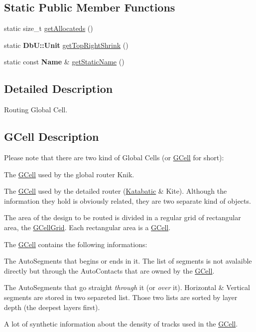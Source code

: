 \subsection*{Static Public Member Functions}
\begin{DoxyCompactItemize}
\item 
static size\+\_\+t \hyperlink{classKatabatic_1_1GCell_a91c8bc1a6bdb1b15c3c084ebfd38af47}{get\+Allocateds} ()
\item 
static \textbf{ Db\+U\+::\+Unit} \hyperlink{classKatabatic_1_1GCell_ac594cb2832ee7ef410c89499258d38fd}{get\+Top\+Right\+Shrink} ()
\item 
static const \textbf{ Name} \& \hyperlink{classKatabatic_1_1GCell_a00e56270cfb31f56e52e31afbc33ba71}{get\+Static\+Name} ()
\end{DoxyCompactItemize}


\subsection{Detailed Description}
Routing Global Cell. 

\hypertarget{classKatabatic_1_1GCell_secGCellDescription}{}\subsection{G\+Cell Description}\label{classKatabatic_1_1GCell_secGCellDescription}
Please note that there are two kind of Global Cells (or \hyperlink{classKatabatic_1_1GCell}{G\+Cell} for short)\+:
\begin{DoxyItemize}
\item The \hyperlink{classKatabatic_1_1GCell}{G\+Cell} used by the global router Knik.
\item The \hyperlink{classKatabatic_1_1GCell}{G\+Cell} used by the detailed router (\hyperlink{namespaceKatabatic}{Katabatic} \& Kite). Although the information they hold is obviously related, they are two separate kind of objects.
\end{DoxyItemize}

The area of the design to be routed is divided in a regular grid of rectangular area, the \hyperlink{classKatabatic_1_1GCellGrid}{G\+Cell\+Grid}. Each rectangular area is a \hyperlink{classKatabatic_1_1GCell}{G\+Cell}.

The \hyperlink{classKatabatic_1_1GCell}{G\+Cell} contains the following informations\+:
\begin{DoxyItemize}
\item The Auto\+Segments that begins or ends in it. The list of segments is not avalaible directly but through the Auto\+Contacts that are owned by the \hyperlink{classKatabatic_1_1GCell}{G\+Cell}.
\item The Auto\+Segments that go straight {\itshape through} it (or {\itshape over} it). Horizontal \& Vertical segments are stored in two separeted list. Those two lists are sorted by layer depth (the deepest layers first).
\item A lot of synthetic information about the density of tracks used in the \hyperlink{classKatabatic_1_1GCell}{G\+Cell}.
\end{DoxyItemize}

